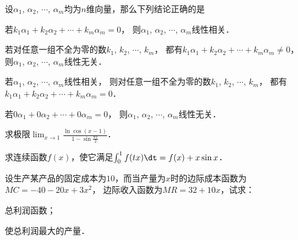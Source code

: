 \documentclass[plain,noanswer,medmath]{../../template/jnuexam}
\begin{document}
\begin{problem}
设$\alpha_1$, $\alpha_2$, $\cdots$, $\alpha_m$均为$n$维向量，那么下列结论正确的是\pickout{}
\begin{abcd}
\item 若$k_1\alpha_1 + k_2\alpha_2 + \cdots + k_m \alpha_m = 0$，
      则$\alpha_1$, $\alpha_2$, $\cdots$, $\alpha_m$线性相关．
\item 若对任意一组不全为零的数$k_1$, $k_2$, $\cdots$, $k_m$，
      都有$k_1\alpha_1 + k_2\alpha_2 + \cdots + k_m \alpha_m \ne 0$，
      则$\alpha_1$, $\alpha_2$, $\cdots$, $\alpha_m$线性无关．
\item 若$\alpha_1$, $\alpha_2$, $\cdots$, $\alpha_m$线性相关，
      则对任意一组不全为零的数$k_1$, $k_2$, $\cdots$, $k_m$，
      都有$k_1\alpha_1 + k_2\alpha_2 + \cdots + k_m \alpha_m = 0$．
\item 若$0\alpha_1 + 0\alpha_2 + \cdots + 0\alpha_m = 0$，
      则$\alpha_1$, $\alpha_2$, $\cdots$, $\alpha_m$线性无关．
\end{abcd}
\end{problem}





\begin{problem}
求极限$\lim_{x \to 1} \frac{\ln \cos(x - 1)}{1 - \sin \frac{\pi x}{2}}$．
\end{problem}






\begin{problem}
求连续函数$f(x)$，使它满足$\int_0^1f(tx)\dt = f(x) + x\sin x$．
\end{problem}






\begin{problem}
设生产某产品的固定成本为$10$，而当产量为$x$时的边际成本函数为$MC = - 40 - 20x + 3x^2$，
边际收入函数为$MR = 32 + 10x$，试求：\par
\begin{enumerate*}
\item 总利润函数；
\item 使总利润最大的产量．
\end{enumerate*}
\end{problem}
\end{document}
